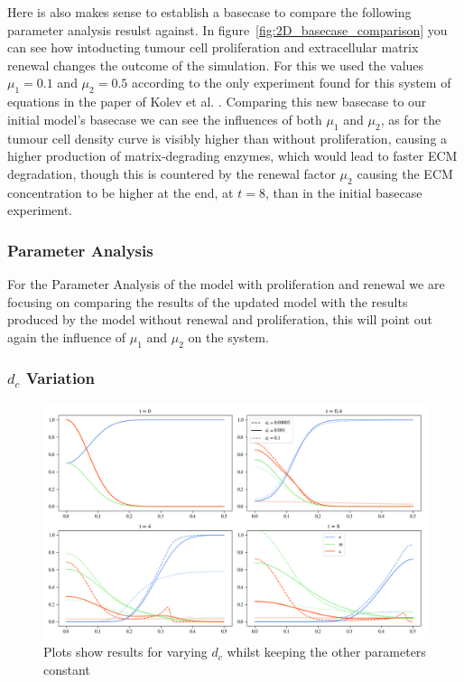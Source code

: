 Here is also makes sense to establish a basecase to compare the following parameter analysis resulst against. In figure~\ref{fig:2D_basecase_comparison} you can see how intoducting tumour cell proliferation and extracellular matrix renewal changes the outcome of the simulation. For this we used the values $\mu_1= 0.1$ and $\mu_2=0.5$ according to the only experiment found for this system of equations in the paper of Kolev et al. \cite{Kolev2010}.\newline
Comparing this new basecase to our initial model's basecase we can see the influences of both $\mu_1$ and $\mu_2$, as for the tumour cell density curve is visibly higher than without proliferation, causing a higher production of matrix-degrading enzymes, which would lead to faster ECM degradation, though this is countered by the renewal factor $\mu_2$ causing the ECM concentration to be higher at the end, at $t=8$, than in the initial basecase experiment.




\subsubsection{Parameter Analysis}

For the Parameter Analysis of the model with proliferation and renewal we are focusing on comparing the results of the updated model with the results produced by the model without renewal and proliferation, this will point out again the influence of $\mu_1$ and $\mu_2$ on the system. 

\subsubsection*{$d_c$ Variation}
\begin{figure}[h]
    \centering
    \includegraphics[width=\textwidth]{resources/images/prolif_dc_variation.png}
    \caption{Plots show results for varying $d_c$ whilst keeping the other parameters constant}
    \label{fig:prolif_dc_comparison}
\end{figure}

